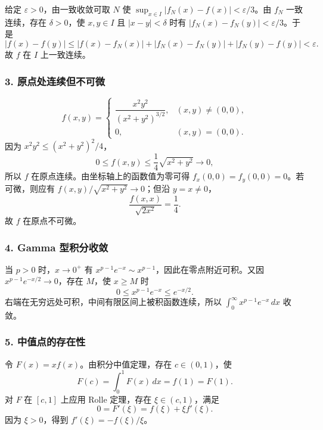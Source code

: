 \documentclass[11pt,fontset=fandol]{ctexart}
\begin{document}
给定 \(\varepsilon>0\)，由一致收敛可取 \(N\) 使
\(\sup_{x\in I}|f_N(x)-f(x)|<\varepsilon/3\)。由 \(f_N\) 一致连续，存在
\(\delta>0\)，使 \(x,y\in I\) 且 \(|x-y|<\delta\) 时有
\(|f_N(x)-f_N(y)|<\varepsilon/3\)。于是 \[
|f(x)-f(y)|\leq|f(x)-f_N(x)|+|f_N(x)-f_N(y)|+|f_N(y)-f(y)|<\varepsilon.
\] 故 \(f\) 在 \(I\) 上一致连续。

\subsubsection{3.
原点处连续但不可微}\label{ux539fux70b9ux5904ux8fdeux7eedux4f46ux4e0dux53efux5fae}

\[
f(x,y)=\begin{cases}\dfrac{x^2y^2}{(x^2+y^2)^{3/2}},&(x,y)\neq(0,0),\\0,&(x,y)=(0,0).\end{cases}
\] 因为 \(x^2y^2\leq(x^2+y^2)^2/4\)， \[
0\leq f(x,y)\leq\frac14\sqrt{x^2+y^2}\longrightarrow0,
\] 所以 \(f\) 在原点连续。由坐标轴上的函数值为零可得
\(f_x(0,0)=f_y(0,0)=0\)。若可微，则应有
\(f(x,y)/\sqrt{x^2+y^2}\to0\)；但沿 \(y=x\neq0\)， \[
\frac{f(x,x)}{\sqrt{2x^2}}=\frac14.
\] 故 \(f\) 在原点不可微。

\subsubsection{4. Gamma
型积分收敛}\label{gamma-ux578bux79efux5206ux6536ux655b}

当 \(p>0\) 时，\(x\to0^+\) 有
\(x^{p-1}e^{-x}\sim x^{p-1}\)，因此在零点附近可积。又因
\(x^{p-1}e^{-x/2}\to0\)，存在 \(M\)，使 \(x\geq M\) 时 \[
0\leq x^{p-1}e^{-x}\leq e^{-x/2}.
\] 右端在无穷远处可积，中间有限区间上被积函数连续，所以
\(\int_0^{\infty}x^{p-1}e^{-x}\,dx\) 收敛。

\subsubsection{5.
中值点的存在性}\label{ux4e2dux503cux70b9ux7684ux5b58ux5728ux6027}

令 \(F(x)=xf(x)\)。由积分中值定理，存在 \(c\in(0,1)\)，使 \[
F(c)=\int_0^1F(x)\,dx=f(1)=F(1).
\] 对 \(F\) 在 \([c,1]\) 上应用 Rolle 定理，存在 \(\xi\in(c,1)\)，满足
\[
0=F'(\xi)=f(\xi)+\xi f'(\xi).
\] 因为 \(\xi>0\)，得到 \(\boxed{f'(\xi)=-f(\xi)/\xi}\)。
\end{document}
